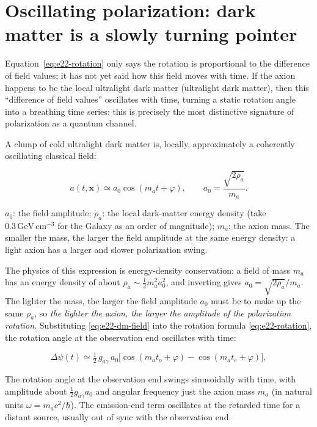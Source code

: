 \section{Oscillating polarization: dark matter is a slowly turning pointer}
\label{sec:e22-oscillation}

Equation~\eqref{eq:e22-rotation} only says the rotation is proportional to the difference of field values; it has not yet said how this field moves with time. If the axion happens to be the local ultralight dark matter (ultralight dark matter), then this ``difference of field values'' oscillates with time, turning a static rotation angle into a breathing time series: this is precisely the most distinctive signature of polarization as a quantum channel.

A clump of cold ultralight dark matter is, locally, approximately a coherently oscillating classical field:

\begin{equation}
  a(t,\bm x)\simeq a_0\cos(m_a t+\varphi),
  \qquad
  a_0=\frac{\sqrt{2\rho_a}}{m_a}.
  \label{eq:e22-dm-field}
\end{equation}
\begin{formulaexplain}
\(a_0\): the field amplitude; \(\rho_a\): the local dark-matter energy density (take \(0.3\,\mathrm{GeV\,cm^{-3}}\) for the Galaxy as an order of magnitude); \(m_a\): the axion mass. The smaller the mass, the larger the field amplitude at the same energy density: a light axion has a larger and slower polarization swing.
\end{formulaexplain}

The physics of this expression is energy-density conservation: a field of mass \(m_a\) has an energy density of about \(\rho_a\sim\tfrac12 m_a^2 a_0^2\), and inverting gives \(a_0=\sqrt{2\rho_a}/m_a\). The lighter the mass, the larger the field amplitude \(a_0\) must be to make up the same \(\rho_a\), so \emph{the lighter the axion, the larger the amplitude of the polarization rotation}. Substituting \eqref{eq:e22-dm-field} into the rotation formula \eqref{eq:e22-rotation}, the rotation angle at the observation end oscillates with time:

\begin{equation}
  \Delta\psi(t)\simeq \tfrac12\,g_{a\gamma}\,a_0
  \big[\cos(m_a t_o+\varphi)-\cos(m_a t_e+\varphi)\big],
  \label{eq:e22-osc-signal}
\end{equation}
\begin{formulaexplain}
The rotation angle at the observation end swings sinusoidally with time, with amplitude about \(\tfrac12 g_{a\gamma}a_0\) and angular frequency just the axion mass \(m_a\) (in natural units \(\omega=m_ac^2/\hbar\)). The emission-end term oscillates at the retarded time for a distant source, usually out of sync with the observation end.
\end{formulaexplain}

